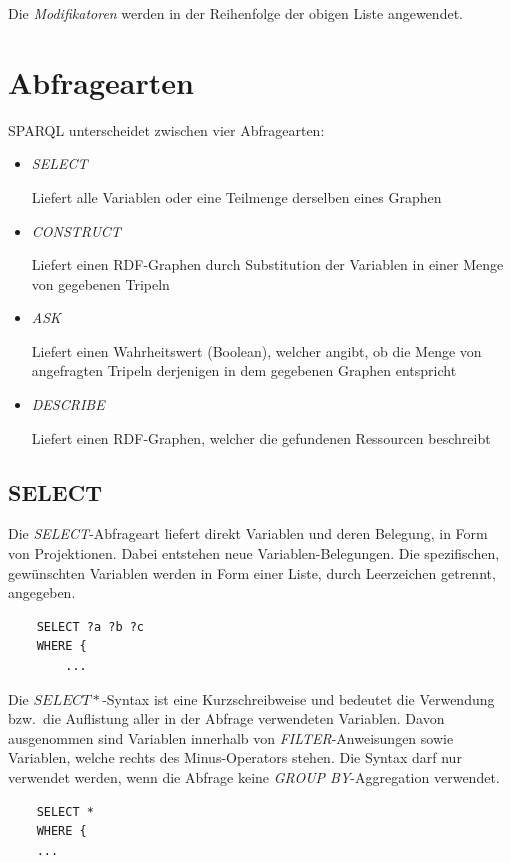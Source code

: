 Die \textit{Modifikatoren} werden in der Reihenfolge der obigen Liste angewendet.~\cite[vgl. 15 Solution Sequences and Modifiers]{w3sparql_querylang}


\section{Abfragearten}
\label{sec:sparql_abfragearten}

SPARQL unterscheidet zwischen vier Abfragearten:
\begin{itemize}
    \item \textit{SELECT}

        Liefert alle Variablen oder eine Teilmenge derselben eines Graphen

    \item \textit{CONSTRUCT}

        Liefert einen RDF-Graphen durch Substitution der Variablen in einer Menge von gegebenen Tripeln

    \item \textit{ASK}

        Liefert einen Wahrheitswert (Boolean), welcher angibt, ob die Menge von angefragten Tripeln derjenigen in dem gegebenen Graphen entspricht

    \item \textit{DESCRIBE}

        Liefert einen RDF-Graphen, welcher die gefundenen Ressourcen beschreibt
\end{itemize}

\subsection{SELECT}
\label{subsec:sparql_abfragearten_select}
Die \textit{SELECT}-Abfrageart liefert direkt Variablen und deren Belegung, in Form von Projektionen. Dabei entstehen neue Variablen-Belegungen. Die spezifischen, gewünschten Variablen werden in Form einer Liste, durch Leerzeichen getrennt, angegeben.

\begin{lstlisting}
    SELECT ?a ?b ?c
    WHERE {
        ...
\end{lstlisting}

Die $ SELECT * $-Syntax ist eine Kurzschreibweise und bedeutet die Verwendung bzw.\ die Auflistung aller in der Abfrage verwendeten Variablen. Davon ausgenommen sind Variablen innerhalb von \textit{FILTER}-Anweisungen sowie Variablen, welche rechts des Minus-Operators stehen. Die Syntax darf nur verwendet werden, wenn die Abfrage keine \textit{GROUP BY}-Aggregation verwendet.
\begin{lstlisting}
    SELECT *
    WHERE {
    ...
\end{lstlisting}

